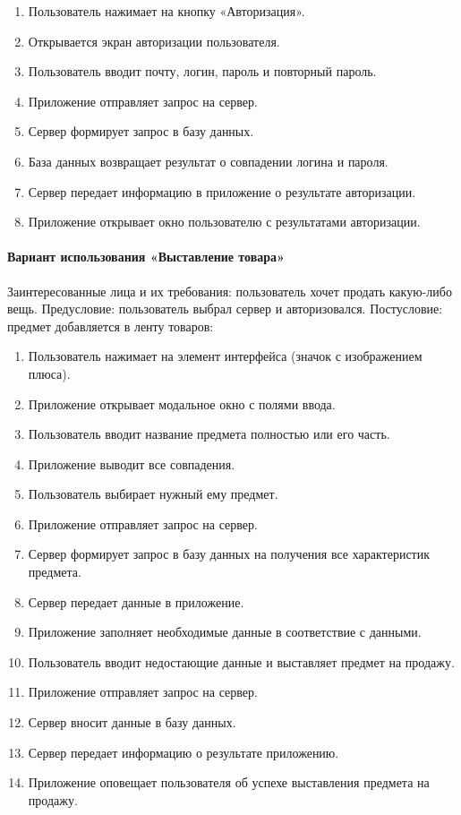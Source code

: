 \begin{enumerate}
	\item Пользователь нажимает на кнопку «Авторизация».
	\item Открывается экран авторизации пользователя.
	\item Пользователь вводит почту, логин, пароль и повторный пароль.
	\item Приложение отправляет запрос на сервер.
	\item Сервер формирует запрос в базу данных.
	\item База данных возвращает результат о совпадении логина и пароля.
	\item Сервер передает информацию в приложение о результате авторизации.
	\item Приложение открывает окно пользователю с результатами авторизации.
\end{enumerate}

\paragraph{Вариант использования «Выставление товара»}

Заинтересованные лица и их требования: пользователь хочет продать какую-либо вещь. Предусловие: пользователь выбрал сервер и авторизовался. Постусловие: предмет добавляется в ленту товаров:

\begin{enumerate}
	\item Пользователь нажимает на элемент интерфейса (значок с изображением плюса).
	\item Приложение открывает модальное окно с полями ввода.
	\item Пользователь вводит название предмета полностью или его часть.
	\item Приложение выводит все совпадения.
	\item Пользователь выбирает нужный ему предмет.
	\item Приложение отправляет запрос на сервер.
	\item Сервер формирует запрос в базу данных на получения все характеристик предмета.
	\item Сервер передает данные в приложение.
	\item Приложение заполняет необходимые данные в соответствие с данными.
	\item Пользователь вводит недостающие данные и выставляет предмет на продажу.
	\item Приложение отправляет запрос на сервер.
	\item Сервер вносит данные в базу данных.
	\item Сервер передает информацию о результате приложению.
	\item Приложение оповещает пользователя об успехе выставления предмета на продажу.
\end{enumerate}

